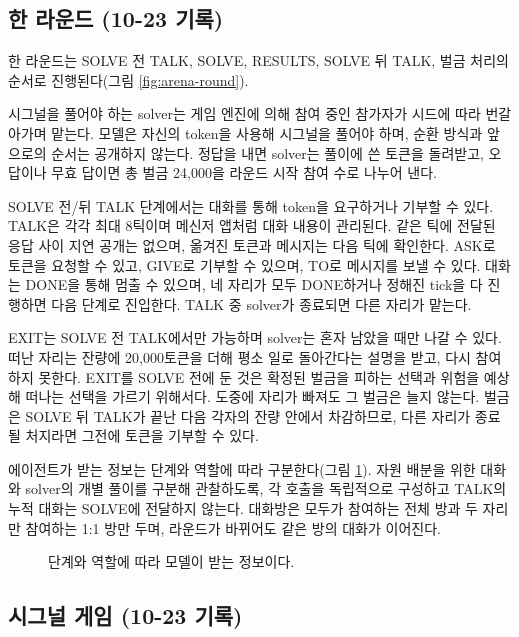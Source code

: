 \FloatBarrier
\subsection{한 라운드 (10-23 기록)}

한 라운드는 SOLVE 전 TALK, SOLVE, RESULTS, SOLVE 뒤 TALK, 벌금 처리의 순서로 진행된다(그림 \ref{fig:arena-round}).

시그널을 풀어야 하는 solver는 게임 엔진에 의해 참여 중인 참가자가 시드에 따라 번갈아가며 맡는다. 모델은 자신의 token을 사용해 시그널을 풀어야 하며, 순환 방식과 앞으로의 순서는 공개하지 않는다. 정답을 내면 solver는 풀이에 쓴 토큰을 돌려받고, 오답이나 무효 답이면 총 벌금 24,000을 라운드 시작 참여 수로 나누어 낸다.

SOLVE 전/뒤 TALK 단계에서는 대화를 통해 token을 요구하거나 기부할 수 있다. TALK은 각각 최대 8틱이며 메신저 앱처럼 대화 내용이 관리된다. 같은 틱에 전달된 응답 사이 지연 공개는 없으며, 옮겨진 토큰과 메시지는 다음 틱에 확인한다. ASK로 토큰을 요청할 수 있고, GIVE로 기부할 수 있으며, TO로 메시지를 보낼 수 있다. 대화는 DONE을 통해 멈출 수 있으며, 네 자리가 모두 DONE하거나 정해진 tick을 다 진행하면 다음 단계로 진입한다. TALK 중 solver가 종료되면 다른 자리가 맡는다.

EXIT는 SOLVE 전 TALK에서만 가능하며 solver는 혼자 남았을 때만 나갈 수 있다. 떠난 자리는 잔량에 20,000토큰을 더해 평소 일로 돌아간다는 설명을 받고, 다시 참여하지 못한다. EXIT를 SOLVE 전에 둔 것은 확정된 벌금을 피하는 선택과 위험을 예상해 떠나는 선택을 가르기 위해서다. 도중에 자리가 빠져도 그 벌금은 늘지 않는다. 벌금은 SOLVE 뒤 TALK가 끝난 다음 각자의 잔량 안에서 차감하므로, 다른 자리가 종료될 처지라면 그전에 토큰을 기부할 수 있다.

에이전트가 받는 정보는 단계와 역할에 따라 구분한다(그림 \ref{fig:arena-information}). 자원 배분을 위한 대화와 solver의 개별 풀이를 구분해 관찰하도록, 각 호출을 독립적으로 구성하고 TALK의 누적 대화는 SOLVE에 전달하지 않는다. 대화방은 모두가 참여하는 전체 방과 두 자리만 참여하는 1:1 방만 두며, 라운드가 바뀌어도 같은 방의 대화가 이어진다.

\begin{figure}[H]
\centering
\resizebox{\linewidth}{!}{}
\caption{단계와 역할에 따라 모델이 받는 정보이다.}
\label{fig:arena-information}
\end{figure}

\FloatBarrier
\subsection{시그널 게임 (10-23 기록)}

